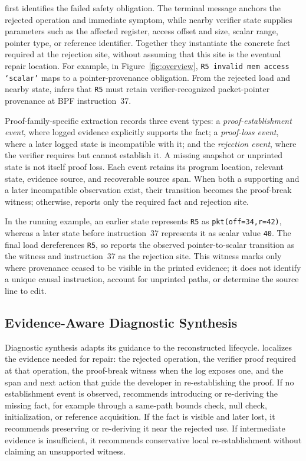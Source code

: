 \sys first identifies the failed safety obligation. The terminal message anchors the rejected operation and immediate symptom, while nearby verifier state supplies parameters such as the affected register, access offset and size, scalar range, pointer type, or reference identifier. Together they instantiate the concrete fact required at the rejection site, without assuming that this site is the eventual repair location. For example, in Figure~\ref{fig:overview}, \texttt{R5 invalid mem access `scalar'} maps to a pointer-provenance obligation. From the rejected load and nearby state, \sys infers that \texttt{R5} must retain verifier-recognized packet-pointer provenance at BPF instruction~37.

Proof-family-specific extraction records three event types: a \emph{proof-establishment event}, where logged evidence explicitly supports the fact; a \emph{proof-loss event}, where a later logged state is incompatible with it; and the \emph{rejection event}, where the verifier requires but cannot establish it. A missing snapshot or unprinted state is not itself proof loss. Each event retains its program location, relevant state, evidence source, and recoverable source span. When both a supporting and a later incompatible observation exist, their transition becomes the proof-break witness; otherwise, \sys reports only the required fact and rejection site.

In the running example, an earlier state represents \texttt{R5} as \texttt{pkt(off=34,r=42)}, whereas a later state before instruction~37 represents it as scalar value \texttt{40}. The final load dereferences \texttt{R5}, so \sys reports the observed pointer-to-scalar transition as the witness and instruction~37 as the rejection site. This witness marks only where provenance ceased to be visible in the printed evidence; it does not identify a unique causal instruction, account for unprinted paths, or determine the source line to edit.

\subsection{Evidence-Aware Diagnostic Synthesis}
\label{sec:design-synthesis}

Diagnostic synthesis adapts its guidance to the reconstructed lifecycle. \sys localizes the evidence
needed for repair: the rejected operation, the verifier proof required at that operation, the proof-break witness when the log exposes one, and the span and next action that guide the developer in re-establishing the proof. If no establishment event is observed, \sys recommends introducing or re-deriving the missing fact, for example through a same-path bounds check, null check, initialization, or reference acquisition. If the fact is visible and later lost, it recommends preserving or re-deriving it near the rejected use. If intermediate evidence is insufficient, it recommends conservative local re-establishment without claiming an unsupported witness.


